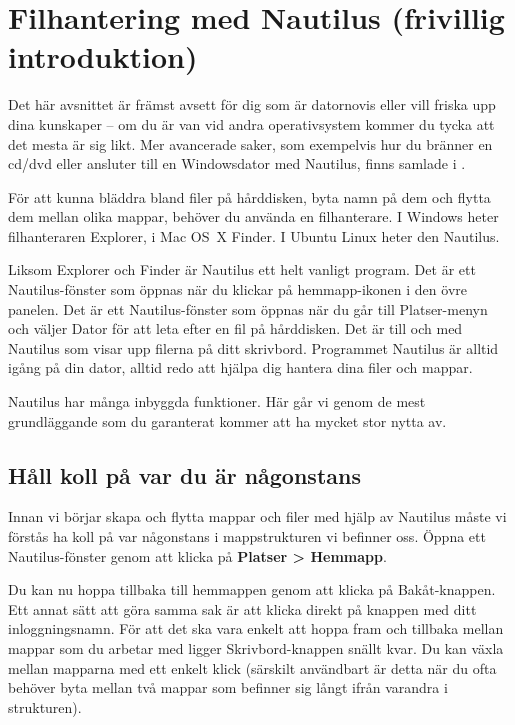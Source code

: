 \documentclass[a4paper,final]{memoir} %
\begin{document}

\section{Filhantering med Nautilus (frivillig introduktion)}\label{sec:nautilus}


Det här avsnittet är främst avsett för dig som är datornovis eller vill friska upp dina kunskaper -- om du är van vid andra operativsystem kommer du tycka att det mesta är sig likt. Mer avancerade saker, som exempelvis hur du bränner en cd/dvd eller ansluter till en Windowsdator med Nautilus,  finns samlade i .

För att kunna bläddra bland filer på hårddisken, byta namn på dem och flytta dem mellan olika mappar, behöver du använda en filhanterare. I Windows heter filhanteraren Explorer, i Mac OS~X Finder. I Ubuntu Linux heter den Nautilus.

Liksom Explorer och Finder är Nautilus ett helt vanligt program. Det är ett Nautilus-fönster som öppnas när du klickar på hemmapp-ikonen i den övre panelen. Det är ett Nautilus-fönster som öppnas när du går till Platser-menyn och väljer Dator för att leta efter en fil på hårddisken. Det är till och med Nautilus som visar upp filerna på ditt skrivbord. Programmet Nautilus är alltid igång på din dator, alltid redo att hjälpa dig hantera dina filer och mappar.

Nautilus har många inbyggda funktioner. Här går vi genom de mest grundläggande som du garanterat kommer att ha mycket stor nytta av. 

\subsection{Håll koll på var du är någonstans}

Innan vi börjar skapa och flytta mappar och filer med hjälp av Nautilus måste vi förstås ha koll på var någonstans i mappstrukturen vi befinner oss. Öppna ett Nautilus-fönster genom att klicka på \textbf{Platser \textgreater{} Hemmapp}.



Du kan nu hoppa tillbaka till hemmappen genom att klicka på Bakåt-knappen. Ett annat sätt att göra samma sak är att klicka direkt på knappen med ditt inloggningsnamn. För att det ska vara enkelt att hoppa fram och tillbaka mellan mappar som du arbetar med ligger Skrivbord-knappen snällt kvar. Du kan växla mellan mapparna med ett enkelt klick (särskilt användbart är detta när du ofta behöver byta mellan två mappar som befinner sig långt ifrån varandra i strukturen).
\end{document}
